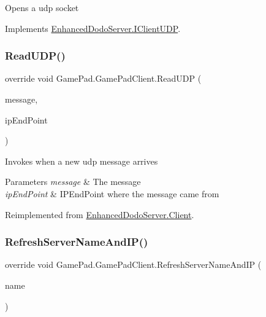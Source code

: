 Opens a udp socket 



Implements \mbox{\hyperlink{interface_enhanced_dodo_server_1_1_i_client_u_d_p}{Enhanced\+Dodo\+Server.\+I\+Client\+U\+DP}}.

\mbox{\label{class_game_pad_1_1_game_pad_client_a73e8617c4d3db915a54b5daefd7928af}} 
\subsubsection{\texorpdfstring{ReadUDP()}{ReadUDP()}}
{\footnotesize\ttfamily override void Game\+Pad.\+Game\+Pad\+Client.\+Read\+U\+DP (\begin{DoxyParamCaption}\item[{string}]{message,  }\item[{I\+P\+End\+Point}]{ip\+End\+Point }\end{DoxyParamCaption})\hspace{0.3cm}{\ttfamily [virtual]}}



Invokes when a new udp message arrives 


\begin{DoxyParams}{Parameters}
{\em message} & The message\\
\hline
{\em ip\+End\+Point} & I\+P\+End\+Point where the message came from\\
\hline
\end{DoxyParams}


Reimplemented from \mbox{\hyperlink{class_enhanced_dodo_server_1_1_client_ab3e43c3998a31c73e1f3c0f98d0bf2e9}{Enhanced\+Dodo\+Server.\+Client}}.

\mbox{\label{class_game_pad_1_1_game_pad_client_afca4e18b9b18482ce56f82e7f1fdd639}} 
\subsubsection{\texorpdfstring{RefreshServerNameAndIP()}{RefreshServerNameAndIP()}}
{\footnotesize\ttfamily override void Game\+Pad.\+Game\+Pad\+Client.\+Refresh\+Server\+Name\+And\+IP (\begin{DoxyParamCaption}\item[{string}]{name }\end{DoxyParamCaption})\hspace{0.3cm}{\ttfamily [virtual]}}



